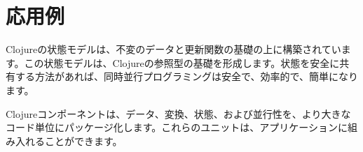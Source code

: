 \part{応用例}

Clojureの状態モデルは、不変のデータと更新関数の基礎の上に構築されています。この状態モデルは、Clojureの参照型の基礎を形成します。状態を安全に共有する方法があれば、同時並行プログラミングは安全で、効率的で、簡単になります。

Clojureコンポーネントは、データ、変換、状態、および並行性を、より大きなコード単位にパッケージ化します。これらのユニットは、アプリケーションに組み入れることができます。


